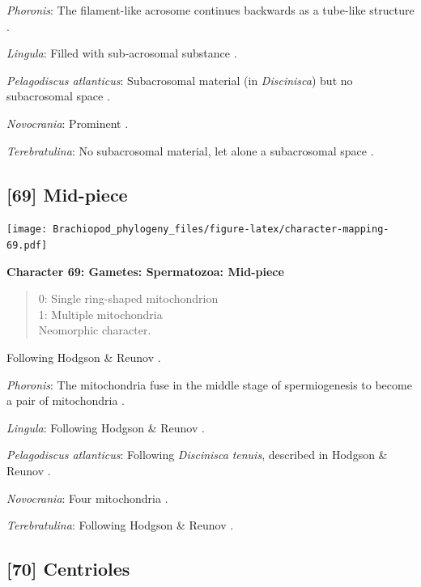 \documentclass[]{book}
\theoremstyle{definition}
\theoremstyle{definition}
\theoremstyle{definition}
\theoremstyle{remark}
\begin{document}
\emph{Phoronis}: The filament-like acrosome continues backwards as a
tube-like structure \citep[summarized in
\citet{Jamieson1991FishEvolution}]{Franzen1980Ultrastructureof}.

\emph{Lingula}: Filled with sub-acrosomal substance
\citep{Fukumoto2003Theacrosome}.

\emph{Pelagodiscus atlanticus}: Subacrosomal material (in
\emph{Discinisca}) but no subacrosomal space
\citep{Hodgson1994Ultrastructureof}.

\emph{Novocrania}: Prominent \citep{Afzelius1978Finestructure}.

\emph{Terebratulina}: No subacrosomal material, let alone a subacrosomal
space \citep[e.g.][]{Hodgson1994Ultrastructureof}.

\hypertarget{mid-piece}{%
\subsection*{{[}69{]} Mid-piece}\label{mid-piece}}

\texttt{[image: Brachiopod\_phylogeny\_files/figure-latex/character-mapping-69.pdf]}

\textbf{Character 69: Gametes: Spermatozoa: Mid-piece}

\begin{quote}
0: Single ring-shaped mitochondrion\\
1: Multiple mitochondria\\
Neomorphic character.
\end{quote}

Following Hodgson \& Reunov \citeyearpar{Hodgson1994Ultrastructureof}.

\emph{Phoronis}: The mitochondria fuse in the middle stage of
spermiogenesis to become a pair of mitochondria
\citep{Reunov2004Ultrastructuralstudy}.

\emph{Lingula}: Following Hodgson \& Reunov
\citeyearpar{Hodgson1994Ultrastructureof}.

\emph{Pelagodiscus atlanticus}: Following \emph{Discinisca}
\emph{tenuis}, described in Hodgson \& Reunov
\citeyearpar{Hodgson1994Ultrastructureof}.

\emph{Novocrania}: Four mitochondria \citep{Afzelius1978Finestructure}.

\emph{Terebratulina}: Following Hodgson \& Reunov
\citeyearpar{Hodgson1994Ultrastructureof}.

\hypertarget{centrioles}{%
\subsection*{{[}70{]} Centrioles}\label{centrioles}}
\end{document}
